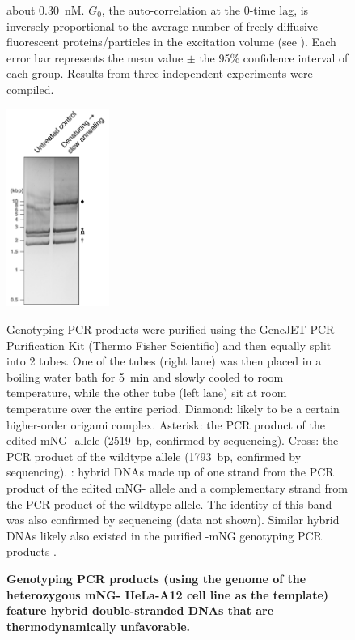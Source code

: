 \begin{figure} [t!]
about \SI{0.30}{nM}. $G_0$, the auto-correlation at the 0-time lag, is inversely proportional to the average number of freely diffusive fluorescent proteins/particles in the excitation volume (see ). Each error bar represents the mean value $\pm$ the 95\% confidence interval of each group. Results from three independent experiments were compiled.
\end{figure}

\begin{figure}
    \centering
    \includegraphics[width=0.3\textwidth]{chapters/figures/HybridGenotypingdsDNA.pdf}
    \caption{\textbf{Genotyping PCR products (using the genome of the heterozygous mNG- HeLa-A12 cell line as the template) feature hybrid double-stranded DNAs that are thermodynamically unfavorable.}}
    \noindent\justifying Genotyping PCR products were purified using the GeneJET PCR Purification Kit (Thermo Fisher Scientific) and then equally split into 2 tubes. One of the tubes (right lane) was then placed in a boiling water bath for \SI{5}{min} and slowly cooled to room temperature, while the other tube (left lane) sit at room temperature over the entire period. Diamond: likely to be a certain higher-order origami complex. Asterisk: the PCR product of the edited mNG- allele (\SI{2519}{bp}, confirmed by sequencing). Cross: the PCR product of the wildtype  allele (\SI{1793}{bp}, confirmed by sequencing). \underline{\textOmega{}}: hybrid DNAs made up of one strand from the PCR product of the edited mNG- allele and a complementary strand from the PCR product of the wildtype  allele. The identity of this band was also confirmed by sequencing (data not shown). Similar hybrid DNAs likely also existed in the purified -mNG genotyping PCR products .
    \label{HybridGenotypingdsDNA}
\end{figure}

